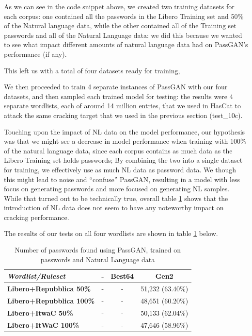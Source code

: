 As we can see in the code snippet above, we created two training datasets for each corpus: one contained all the passwords in the Libero Training set and 50\% of the Natural language data, while the other contained all of the Training set passwords and all of the Natural Language data: we did this because we wanted to see what impact different amounts of natural language data had on PassGAN's performance (if any).

This left us with a total of four datasets ready for training,

We then proceeded to train 4 separate instances of PassGAN with our four datasets, and then sampled each trained model for testing: the results were 4 separate wordlists, each of around 14 million entries, that we used in HasCat to attack the same cracking target that we used in the previous section (test\_10c).

Touching upon the impact of NL data on the model performance, our hypothesis was that we might see a decrease in model performance when training with 100\% of the natural language data, since each corpus contains as much data as the Libero Training set holds passwords; By combining the two into a single dataset for training, we effectively use as much NL data as password data.  We though this might lead to noise and \enquote{confuse} PassGAN, resulting in a model with less focus on generating passwords and more focused on generating NL samples. While that turned out to be technically true, overall table \ref{tab:nl-results} shows that the introduction of NL data does not seem to have any noteworthy impact on cracking performance.

The results of our tests on all four wordlists are shown in table \ref{tab:nl-results} below.

\begin{table}[H]
\centering
\begin{tabular}{|l|c|c|c|}
\hline
 \textbf{\emph{Wordlist/Ruleset}} & \textbf{-} & \textbf{Best64} & \textbf{Gen2} \\ \hline
 \textbf{Libero+Repubblica 50\%} & - & - & 51,232 (63.40\%) \\ \hline
 \textbf{Libero+Repubblica 100\%} & - & - &  48,651 (60.20\%) \\ \hline
 \textbf{Libero+ItwaC 50\%} & - & - &  50,133 (62.04\%) \\ \hline
 \textbf{Libero+ItWaC 100\%} & - & - &  47,646 (58.96\%) \\ \hline
\end{tabular}
\caption{Number of passwords found using PassGAN, trained on passwords and Natural Language data}
\label{tab:nl-results}
\end{table}

